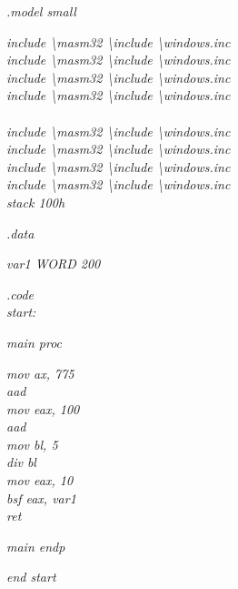 \begin{boxedminipage}{15cm}
	\begin{normalsize}						
				\textit {.model small}
				\begin{changemargin}{1cm}{0.5cm} 
     			\textit { include \textbackslash masm32 \textbackslash include \textbackslash windows.inc}  \\  
				\textit { include \textbackslash masm32 \textbackslash include \textbackslash windows.inc} \\
				\textit { include \textbackslash masm32 \textbackslash include \textbackslash windows.inc} \\
				\textit { include \textbackslash masm32 \textbackslash include \textbackslash windows.inc} \\ \\
				\textit { include \textbackslash masm32 \textbackslash include \textbackslash windows.inc} \\ 
				\textit { include \textbackslash masm32 \textbackslash include \textbackslash windows.inc} \\
				\textit { include \textbackslash masm32 \textbackslash include \textbackslash windows.inc} \\
				\textit { include \textbackslash masm32 \textbackslash include \textbackslash windows.inc} \\
				\textit {stack 100h}
				\end{changemargin}				
				\textit {.data}
				\begin{changemargin}{1cm}{0.5cm} 
						\textit {var1 WORD  200}
				\end{changemargin}				
				\textit {.code}\\
				\textit {start: }
					\begin{changemargin}{1cm}{0.5cm} 
    							\textit {main proc}
    								\begin{changemargin}{1.5cm}{0.5cm} 
        								\textit {mov ax, 775}\\
       							 		\textit {aad   }\\
        								\textit {	mov eax, 100 }\\
       									\textit { aad}\\
        								\textit {	mov bl, 5}\\
        								\textit {	div bl   }\\
										\textit {mov eax, 10}\\
   										\textit {bsf eax, var1}		\\
		  								\textit {ret}
		  							\end{changemargin}	
     						\textit {main endp}
     				\end{changemargin}				
				\textit {end start}
	\end{normalsize}
	\end{boxedminipage}
	
